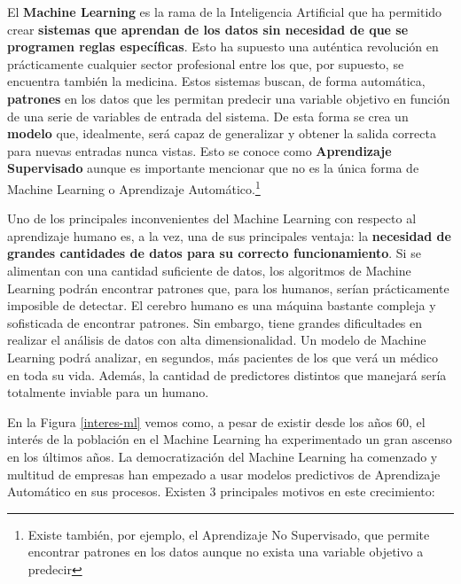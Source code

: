 \documentclass[
  12pt,
  spanish,
  a4paperpaper,
]{report}
\begin{document}
El \textbf{Machine Learning} es la rama de la Inteligencia Artificial
que ha permitido crear \textbf{sistemas que aprendan de los datos sin
necesidad de que se programen reglas específicas}. Esto ha supuesto una
auténtica revolución en prácticamente cualquier sector profesional entre
los que, por supuesto, se encuentra también la medicina. Estos sistemas
buscan, de forma automática, \textbf{patrones} en los datos que les
permitan predecir una variable objetivo en función de una serie de
variables de entrada del sistema. De esta forma se crea un
\textbf{modelo} que, idealmente, será capaz de generalizar y obtener la
salida correcta para nuevas entradas nunca vistas. Esto se conoce como
\textbf{Aprendizaje Supervisado} aunque es importante mencionar que no
es la única forma de Machine Learning o Aprendizaje
Automático.\footnote{Existe también, por ejemplo, el Aprendizaje No
  Supervisado, que permite encontrar patrones en los datos aunque no
  exista una variable objetivo a predecir}

Uno de los principales inconvenientes del Machine Learning con respecto
al aprendizaje humano es, a la vez, una de sus principales ventaja: la
\textbf{necesidad de grandes cantidades de datos para su correcto
funcionamiento}. Si se alimentan con una cantidad suficiente de datos,
los algoritmos de Machine Learning podrán encontrar patrones que, para
los humanos, serían prácticamente imposible de detectar. El cerebro
humano es una máquina bastante compleja y sofisticada de encontrar
patrones. Sin embargo, tiene grandes dificultades en realizar el
análisis de datos con alta dimensionalidad. Un modelo de Machine
Learning podrá analizar, en segundos, más pacientes de los que verá un
médico en toda su vida. Además, la cantidad de predictores distintos que
manejará sería totalmente inviable para un humano.

En la Figura \ref{interes-ml} vemos como, a pesar de existir desde los
años 60, el interés de la población en el Machine Learning ha
experimentado un gran ascenso en los últimos años. La democratización
del Machine Learning ha comenzado y multitud de empresas han empezado a
usar modelos predictivos de Aprendizaje Automático en sus procesos.
Existen 3 principales motivos en este crecimiento:
\end{document}
